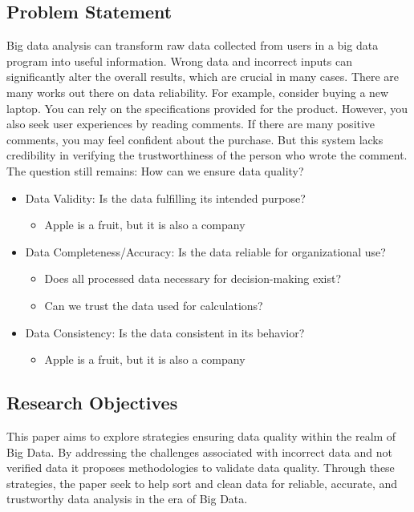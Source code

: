 \documentclass[10pt,a4paper]{article}
\begin{document}
\subsection{Problem Statement}
Big data analysis can transform raw data collected from users in a big data program into useful information.\cite{8063921} Wrong data and incorrect inputs can significantly alter the overall results, which are crucial in many cases.\cite{7838288} There are many works out there on data reliability. For example, consider buying a new laptop. You can rely on the specifications provided for the product. However, you also seek user experiences by reading comments. If there are many positive comments, you may feel confident about the purchase. But this system lacks credibility in verifying the trustworthiness of the person who wrote the comment.\cite{8063921} The question still remains: How can we ensure data quality?
\begin{itemize}
  \item Data Validity: Is the data fulfilling its intended purpose?
  \begin{itemize}
    \item Apple is a fruit, but it is also a company
  \end{itemize}
  \item Data Completeness/Accuracy: Is the data reliable for organizational use?
  \begin{itemize}
      \item Does all processed data necessary for decision-making exist?
      \item Can we trust the data used for calculations?
      \end{itemize}
  \item Data Consistency: Is the data consistent in its behavior?
  \begin{itemize}
    \item Apple is a fruit, but it is also a company
  \end{itemize}
\end{itemize}
\cite{mittal2013trustworthiness}
\subsection{Research Objectives}
This paper aims to explore strategies ensuring data quality within the realm of Big Data. By addressing the challenges associated with incorrect data and not verified data it proposes methodologies to validate data quality. Through these strategies, the paper seek to help sort and clean data for reliable, accurate, and trustworthy data analysis in the era of Big Data.
\end{document}

